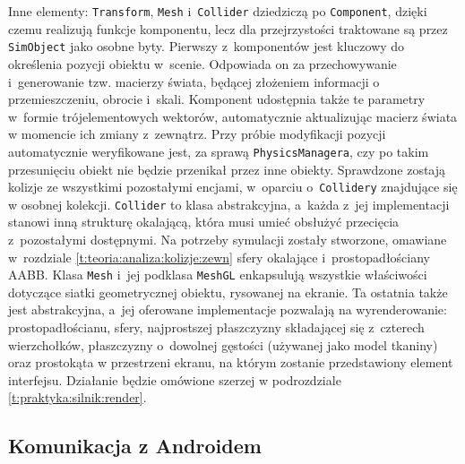 		Inne elementy: \texttt{Transform}, \texttt{Mesh} i~\texttt{Collider} dziedziczą po \texttt{Component}, dzięki czemu realizują funkcje komponentu, lecz dla przejrzystości traktowane są przez \texttt{SimObject} jako osobne byty. Pierwszy z~komponentów jest kluczowy do określenia pozycji obiektu w~scenie. Odpowiada on za przechowywanie i~generowanie tzw. macierzy świata, będącej złożeniem informacji o przemieszczeniu, obrocie i~skali. Komponent udostępnia także te parametry w~formie trójelementowych wektorów, automatycznie aktualizując macierz świata w momencie ich zmiany z~zewnątrz. Przy próbie modyfikacji pozycji automatycznie weryfikowane jest, za sprawą \texttt{PhysicsManagera}, czy po takim przesunięciu obiekt nie będzie przenikał przez inne obiekty. Sprawdzone zostają kolizje ze wszystkimi pozostałymi encjami, w~oparciu o~\texttt{Collidery} znajdujące się w osobnej kolekcji. \texttt{Collider} to klasa abstrakcyjna, a~każda z~jej implementacji stanowi inną strukturę okalającą, która musi umieć obsłużyć przecięcia z~pozostałymi dostępnymi. Na potrzeby symulacji zostały stworzone, omawiane w~rozdziale \ref{t:teoria:analiza:kolizje:zewn} sfery okalające i~prostopadłościany AABB. Klasa \texttt{Mesh} i~jej podklasa \texttt{MeshGL} enkapsulują wszystkie właściwości dotyczące siatki geometrycznej obiektu, rysowanej na ekranie. Ta ostatnia także jest abstrakcyjna, a~jej oferowane implementacje pozwalają na wyrenderowanie: prostopadłościanu, sfery, najprostszej płaszczyzny składającej się z~czterech wierzchołków, płaszczyzny o~dowolnej gęstości (używanej jako model tkaniny) oraz prostokąta w przestrzeni ekranu, na którym zostanie przedstawiony element interfejsu. Działanie będzie omówione szerzej w podrozdziale \ref{t:praktyka:silnik:render}.
		
		\subsection{Komunikacja z Androidem}
		\label{t:praktyka:silnik:andro}
		
		
